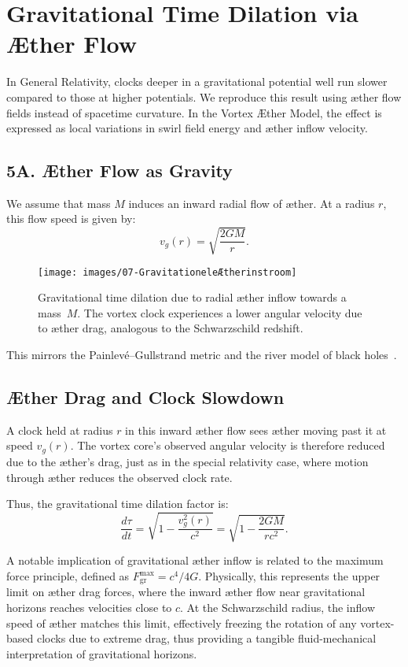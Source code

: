 \section{Gravitational Time Dilation via Æther Flow}

In General Relativity, clocks deeper in a gravitational potential well run slower compared to those at higher potentials. We reproduce this result using æther flow fields instead of spacetime curvature. In the Vortex Æther Model, the effect is expressed as local variations in swirl field energy and æther inflow velocity.

\subsection*{5A. Æther Flow as Gravity}

We assume that mass $M$ induces an inward radial flow of æther. At a radius $r$, this flow speed is given by:
\[
v_g(r) = \sqrt{\frac{2GM}{r}}.
\]

\begin{figure}[htbp]
    \centering
    \texttt{[image: images/07-GravitationeleÆtherinstroom]}
    \caption{Gravitational time dilation due to radial æther inflow towards a mass~$M$. The vortex clock experiences a lower angular velocity due to æther drag, analogous to the Schwarzschild redshift.}
    \label{fig:GravitationeleÆtherinstroom}
\end{figure}

This mirrors the Painlevé–Gullstrand metric and the river model of black holes~\cite{Hamilton2004-river}.

\subsection*{Æther Drag and Clock Slowdown}

A clock held at radius $r$ in this inward æther flow sees æther moving past it at speed $v_g(r)$. The vortex core's observed angular velocity is therefore reduced due to the æther's drag, just as in the special relativity case, where motion through æther reduces the observed clock rate.

Thus, the gravitational time dilation factor is:
\begin{equation}
\frac{d\tau}{dt} = \sqrt{1 - \frac{v_g^2(r)}{c^2}} = \sqrt{1 - \frac{2GM}{rc^2}}.
\end{equation}

A notable implication of gravitational æther inflow is related to the maximum force principle, defined as $F^{\text{max}}_{\text{gr}} = c^4 /4G$. Physically, this represents the upper limit on æther drag forces, where the inward æther flow near gravitational horizons reaches velocities close to $c$. At the Schwarzschild radius, the inflow speed of æther matches this limit, effectively freezing the rotation of any vortex-based clocks due to extreme drag, thus providing a tangible fluid-mechanical interpretation of gravitational horizons.

